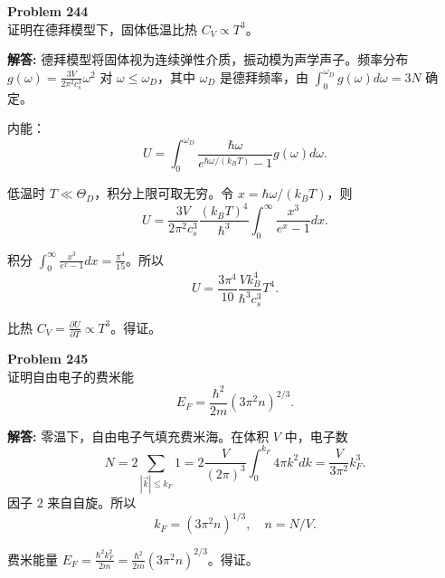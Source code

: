 \documentclass[12pt, a4paper, oneside]{ctexart}
\newenvironment{solution}{\par\noindent\textbf{解答:}\quad}{\par}
\begin{document}
\begin{mdframed}[backgroundcolor=gray!10, linewidth=0pt]
    \textbf{Problem 244} \\
    证明在德拜模型下，固体低温比热 $C_V \propto T^3$。
\end{mdframed}
\begin{solution}
    德拜模型将固体视为连续弹性介质，振动模为声学声子。频率分布 $g(\omega) = \frac{3V}{2\pi^2 c_s^3} \omega^2$ 对 $\omega \le \omega_D$，其中 $\omega_D$ 是德拜频率，由 $\int_0^{\omega_D} g(\omega) d\omega = 3N$ 确定。
    
    内能：
    \[
    U = \int_0^{\omega_D} \frac{\hbar \omega}{e^{\hbar \omega / (k_B T)} - 1} g(\omega) d\omega.
    \]
    
    低温时 $T \ll \Theta_D$，积分上限可取无穷。令 $x = \hbar \omega / (k_B T)$，则
    \[
    U = \frac{3V}{2\pi^2 c_s^3} \frac{(k_B T)^4}{\hbar^3} \int_0^\infty \frac{x^3}{e^x - 1} dx.
    \]
    
    积分 $\int_0^\infty \frac{x^3}{e^x-1} dx = \frac{\pi^4}{15}$。所以
    \[
    U = \frac{3\pi^4}{10} \frac{V k_B^4}{\hbar^3 c_s^3} T^4.
    \]
    
    比热 $C_V = \frac{\partial U}{\partial T} \propto T^3$。得证。
\end{solution}

\begin{mdframed}[backgroundcolor=gray!10, linewidth=0pt]
    \textbf{Problem 245} \\
    证明自由电子的费米能
    \[
    E_F = \frac{\hbar^2}{2m} (3\pi^2 n)^{2/3}.
    \]
\end{mdframed}
\begin{solution}
    零温下，自由电子气填充费米海。在体积 $V$ 中，电子数
    \[
    N = 2 \sum_{|\vec{k}| \le k_F} 1 = 2 \frac{V}{(2\pi)^3} \int_0^{k_F} 4\pi k^2 dk = \frac{V}{3\pi^2} k_F^3.
    \]
    因子 2 来自自旋。所以
    \[
    k_F = (3\pi^2 n)^{1/3}, \quad n = N/V.
    \]
    
    费米能量 $E_F = \frac{\hbar^2 k_F^2}{2m} = \frac{\hbar^2}{2m} (3\pi^2 n)^{2/3}$。得证。
\end{solution}
\end{document}
